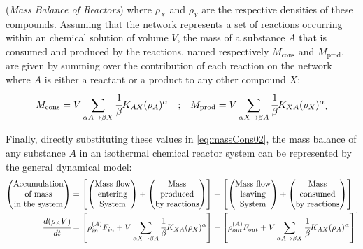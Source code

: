 \documentclass[a4paper,11pt]{book}
\numberwithin{figure}{chapter}
\numberwithin{equation}{chapter}
\numberwithin{table}{chapter}
\theoremstyle{definition}
\newtheorem{example}{Example}[chapter]
\newcounter{boxed-theorem}
\newcounter{boxed-lemma}
\newcounter{boxed-definition}
\newcounter{boxed-example}
\newenvironment{boxed-example}[1]
{\colorlet{shadecolor}{pastelRed!15} \begin{shaded} \begin{example}{#1}}
{\end{example} \end{shaded}}
\begin{document}
\begin{boxed-example}{(\textit{Mass Balance of Reactors})}
    \noindent where $\rho_X$ and $\rho_Y$ are the respective densities of these compounds. Assuming that the network represents a set of reactions occurring within an chemical solution of volume $V$, the mass of a substance $A$ that is consumed and produced by the reactions, named respectively $M_\text{cons}$ and $M_\text{prod}$, are given by summing over the contribution of each reaction on the network where $A$ is either a reactant or a product to any other compound $X$:
    \begin{equation}
    \begin{matrix}
            M_\text{cons} = V \displaystyle\sum_{\alpha A \rightarrow \beta X} \cfrac{1}{\beta} K_{AX} (\rho_A)^{\alpha} &; &  M_\text{prod} = V \displaystyle\sum_{\alpha X \rightarrow \beta A} \cfrac{1}{\beta} K_{XA} (\rho_X)^{\alpha}
    \end{matrix}
    .\end{equation}
    
    Finally, directly substituting these values in \eqref{eq:massCons02}, the mass balance of any substance $A$ in an isothermal chemical reactor system can be represented by the general dynamical model:
    \begin{equation}
    \begin{split}
        \begin{pmatrix}
        \text{Accumulation} \\ \text{of mass} \\ \text{in the system}
    \end{pmatrix} &= \left[ \begin{pmatrix}
        \text{Mass flow} \\ \text{entering} \\ \text{System}
    \end{pmatrix} + \begin{pmatrix}
        \text{Mass} \\  \text{produced} \\ \text{by reactions}
    \end{pmatrix} \right] - \left[ \begin{pmatrix}
        \text{Mass flow} \\ \text{leaving} \\ \text{System}
    \end{pmatrix} + \begin{pmatrix}
        \text{Mass} \\ \text{consumed} \\ \text{by reactions}
    \end{pmatrix} \right] \\
        \cfrac{d (\rho_A V)}{dt} &= \left[ \rho^{(A)}_{in} F_{in} + V \sum_{\alpha X \rightarrow \beta A} \cfrac{1}{\beta} K_{XA} (\rho_X)^{\alpha} \right] - \left[ \rho^{(A)}_{out} F_{out} + V \sum_{\alpha A \rightarrow \beta X} \cfrac{1}{\beta} K_{AX} (\rho_A)^{\alpha} \right]
    \end{split}
    .\end{equation}
    

\end{boxed-example}
\end{document}
